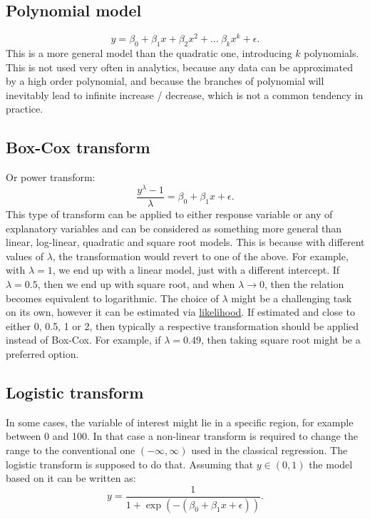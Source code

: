 \documentclass[
]{book}
\theoremstyle{definition}
\theoremstyle{definition}
\theoremstyle{definition}
\theoremstyle{definition}
\theoremstyle{remark}
\begin{document}
\subsection{Polynomial model}\label{polynomial-model}

\begin{equation}
    y = \beta_0 + \beta_1 x + \beta_2 x^2 + \dots \ \beta_k x^k + \epsilon .
    \label{eq:transformPolynomial}
\end{equation}
This is a more general model than the quadratic one, introducing \(k\) polynomials. This is not used very often in analytics, because any data can be approximated by a high order polynomial, and because the branches of polynomial will inevitably lead to infinite increase / decrease, which is not a common tendency in practice.

\subsection{Box-Cox transform}\label{box-cox-transform}

Or power transform:
\begin{equation}
    \frac{y^\lambda -1}{\lambda} = \beta_0 + \beta_1 x + \epsilon .
    \label{eq:transformBoxCox}
\end{equation}
This type of transform can be applied to either response variable or any of explanatory variables and can be considered as something more general than linear, log-linear, quadratic and square root models. This is because with different values of \(\lambda\), the transformation would revert to one of the above. For example, with \(\lambda=1\), we end up with a linear model, just with a different intercept. If \(\lambda=0.5\), then we end up with square root, and when \(\lambda \rightarrow 0\), then the relation becomes equivalent to logarithmic. The choice of \(\lambda\) might be a challenging task on its own, however it can be estimated via \hyperref[likelihoodApproach]{likelihood}. If estimated and close to either 0, 0.5, 1 or 2, then typically a respective transformation should be applied instead of Box-Cox. For example, if \(\lambda=0.49\), then taking square root might be a preferred option.

\subsection{Logistic transform}\label{logistic-transform}

In some cases, the variable of interest might lie in a specific region, for example between 0 and 100. In that case a non-linear transform is required to change the range to the conventional one \((-\infty, \infty)\) used in the classical regression. The logistic transform is supposed to do that. Assuming that \(y \in (0,1)\) the model based on it can be written as:
\begin{equation}
    y = \frac{1}{1+\exp \left(-(\beta_0 + \beta_1 x + \epsilon)\right)}.
    \label{eq:transformLogit}
\end{equation}
\end{document}
